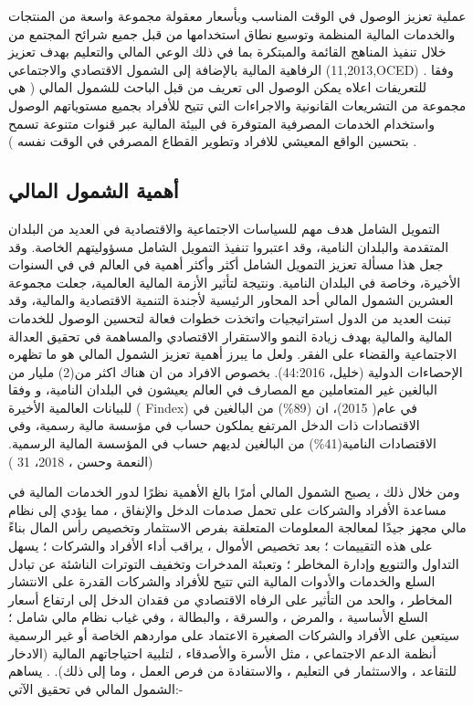\documentclass[10pt,a4paper]{report}
\begin{document}
\begin{doublespacing}
عملية تعزيز الوصول في الوقت المناسب وبأسعار معقولة مجموعة واسعة من المنتجات والخدمات المالية المنظمة وتوسيع نطاق استخدامها من قبل جميع شرائح المجتمع من خلال تنفيذ المناهج القائمة والمبتكرة بما في ذلك الوعي المالي والتعليم بهدف تعزيز الرفاهية المالية بالإضافة إلى الشمول الاقتصادي والاجتماعي (11,2013,OCED) .
وفقا للتعريفات اعلاه يمكن الوصول الى تعريف  من قبل الباحث للشمول المالي ( هي مجموعة  من التشريعات القانونية والاجراءات التي تتيح للأفراد بجميع مستوياتهم الوصول واستخدام الخدمات المصرفية المتوفرة في البيئة المالية عبر قنوات متنوعة تسمح بتحسين الواقع المعيشي للافراد وتطوير القطاع المصرفي في الوقت نفسه ) .
\subsection{أهمية الشمول المالي}
التمويل الشامل هدف مهم للسياسات الاجتماعية والاقتصادية في العديد من البلدان المتقدمة والبلدان النامية، وقد اعتبروا تنفيذ التمويل الشامل مسؤوليتهم الخاصة. وقد جعل هذا مسألة تعزيز التمويل الشامل أكثر وأكثر أهمية في العالم في في السنوات الأخيرة، وخاصة في البلدان النامية. ونتيجة لتأثير الأزمة المالية العالمية، جعلت مجموعة العشرين الشمول المالي أحد المحاور الرئيسية لأجندة التنمية الاقتصادية والمالية، وقد تبنت العديد من الدول استراتيجيات واتخذت خطوات فعالة لتحسين الوصول للخدمات المالية والمالية بهدف زيادة النمو والاستقرار الاقتصادي والمساهمة في تحقيق العدالة الاجتماعية والقضاء على الفقر. ولعل ما يبرز أهمية تعزيز الشمول المالي هو ما تظهره الإحصاءات الدولية (خليل، 44:2016). بخصوص الافراد من ان هناك اكثر من(2) مليار من البالغين غير المتعاملين مع المصارف في العالم يعيشون في البلدان النامية، و وفقا للبيانات العالمية الأخيرة ( Findex)  في عام( 2015)، ان (89\%) من البالغين في الاقتصادات ذات الدخل المرتفع يملكون حساب في مؤسسة مالية رسمية، وفي الاقتصادات النامية(41\%) من البالغين لديهم حساب في المؤسسة المالية الرسمية. (النعمة وحسن ، 2018، 31 )

ومن خلال ذلك ، يصبح الشمول المالي أمرًا بالغ الأهمية نظرًا لدور الخدمات المالية في مساعدة الأفراد والشركات على تحمل صدمات الدخل والإنفاق ، مما يؤدي إلى نظام مالي مجهز جيدًا لمعالجة المعلومات المتعلقة بفرص الاستثمار وتخصيص رأس المال بناءً على هذه التقييمات ؛ بعد تخصيص الأموال ، يراقب أداء الأفراد والشركات ؛ يسهل التداول والتنويع وإدارة المخاطر ؛ وتعبئة المدخرات وتخفيف التوترات الناشئة عن تبادل السلع والخدمات والأدوات المالية التي تتيح للأفراد والشركات القدرة على الانتشار المخاطر ، والحد من التأثير على الرفاه الاقتصادي من فقدان الدخل إلى ارتفاع أسعار السلع الأساسية ، والمرض ، والسرقة ، والبطالة ، وفي غياب نظام مالي شامل ؛ سيتعين على الأفراد والشركات الصغيرة الاعتماد على مواردهم الخاصة أو غير الرسمية أنظمة الدعم الاجتماعي ، مثل الأسرة والأصدقاء ، لتلبية احتياجاتهم المالية (الادخار للتقاعد ، والاستثمار في التعليم ، والاستفادة من فرص العمل ، وما إلى ذلك). . يساهم الشمول المالي في تحقيق الآتي:-

\end{doublespacing}
\end{document}
